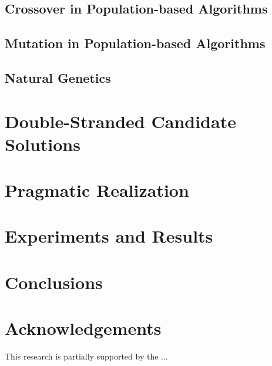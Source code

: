 \documentclass[runningheads]{llncs}
\begin{document}
\subsection{Crossover in Population-based Algorithms}

\subsection{Mutation in Population-based Algorithms}

\subsection{Natural Genetics}

\section{Double-Stranded Candidate Solutions}

\section{Pragmatic Realization}

\section{Experiments and Results}

\section{Conclusions}

\section*{Acknowledgements} This research is partially supported by the ...

\begin{thebibliography}{8}
\bibitem{}
\end{thebibliography}
\end{document}
